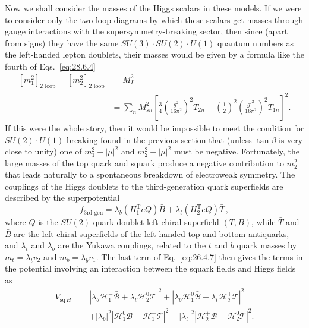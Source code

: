 Now we shall consider the masses of the Higgs scalars in these models. If
we were to consider only the two-loop diagrams by which these scalars get
masses through gauge interactions with the supersymmetry-breaking sector,
then since (apart from signs) they have the same
\(SU(3)\mathbin{\cdot}SU(2)\mathbin{\cdot}U(1)\) quantum numbers as the
left-handed lepton doublets, their masses would be given by a formula like
the fourth of Eqs.~\eqref{eq:28.6.4}
\begin{equation}
  \begin{aligned}
    [m_1^2]_{\text{2 loop}}=[m_2^2]_{\text{2 loop}}
    &=M_L^2\\
    &=\sum_nM_{sn}^2
      \left[
        \frac{3}{4}\left(\frac{g^2}{16\pi^2}\right)^2T_{2n}
        +\left(\frac{1}{2}\right)^2
         \left(\frac{g'^2}{16\pi^2}\right)^2T_{1n}
      \right]^2 .
  \end{aligned}
  \tag{28.6.23}\label{eq:28.6.23}
\end{equation}
If this were the whole story, then it would be impossible to meet the
condition for \(SU(2)\mathbin{\cdot}U(1)\) breaking found in the previous
section that (unless \(\tan\beta\) is very close to unity) one of
\(m_1^2+\lvert\mu\rvert^2\) and \(m_2^2+\lvert\mu\rvert^2\) must be
negative. Fortunately, the large masses of the top quark and squark
produce a negative contribution to \(m_2^2\) that leads naturally to a
spontaneous breakdown of electroweak symmetry. The couplings of the Higgs
doublets to the third-generation quark superfields are described by the
superpotential
\begin{equation}
  f_{\text{3rd gen}}
  =\lambda_b(H_1^{\mathrm{T}}eQ)\bar B
   +\lambda_t(H_2^{\mathrm{T}}eQ)\bar T\,,
  \tag{28.6.24}\label{eq:28.6.24}
\end{equation}
where \(Q\) is the \(SU(2)\) quark doublet left-chiral superfield
\((T,B)\), while \(\bar T\) and \(\bar B\) are the left-chiral
superfields of the left-handed top and bottom antiquarks, and
\(\lambda_t\) and \(\lambda_b\) are the Yukawa couplings, related to the
\(t\) and \(b\) quark masses by \(m_t=\lambda_tv_2\) and
\(m_b=\lambda_bv_1\). The last term of Eq.~\eqref{eq:26.4.7} then gives
the terms in the potential involving an interaction between the squark
fields and Higgs fields as
\begin{equation}
  \begin{aligned}
    V_{\mathrm{sq}\,H}={}&
      \left|
        \lambda_b\mathcal{H}_1^-\bar{\mathcal B}
        +\lambda_t\mathcal{H}_2^0\bar{\mathcal T}
      \right|^2
      +\left|
        \lambda_b\mathcal{H}_1^0\bar{\mathcal B}
        +\lambda_t\mathcal{H}_2^+\bar{\mathcal T}
      \right|^2\\
      &+\lvert\lambda_b\rvert^2
      \left|\mathcal{H}_1^0\mathcal B-\mathcal{H}_1^-\mathcal T\right|^2
      +\lvert\lambda_t\rvert^2
      \left|\mathcal{H}_2^+\mathcal B-\mathcal{H}_2^0\mathcal T\right|^2 .
  \end{aligned}
  \tag{28.6.25}\label{eq:28.6.25}
\end{equation}
